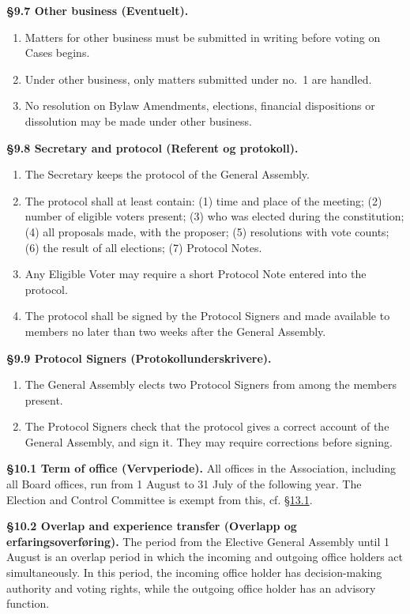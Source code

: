 \documentclass{../../../Common/Latex/Templates/rapport}
\begin{document}
\textbf{\S 9.7 Other business (Eventuelt).}\label{bylaw:9.7}
\begin{enumerate}
  \item Matters for other business must be submitted in writing before voting on Cases begins.
  \item Under other business, only matters submitted under no.\ 1 are handled.
  \item No resolution on Bylaw Amendments, elections, financial dispositions or dissolution may be made under other business.
\end{enumerate}

\textbf{\S 9.8 Secretary and protocol (Referent og protokoll).}\label{bylaw:9.8}
\begin{enumerate}
  \item The Secretary keeps the protocol of the General Assembly.
  \item The protocol shall at least contain: (1) time and place of the meeting; (2) number of eligible voters present; (3) who was elected during the constitution; (4) all proposals made, with the proposer; (5) resolutions with vote counts; (6) the result of all elections; (7) Protocol Notes.
  \item Any Eligible Voter may require a short Protocol Note entered into the protocol.
  \item The protocol shall be signed by the Protocol Signers and made available to members no later than two weeks after the General Assembly.
\end{enumerate}

\textbf{\S 9.9 Protocol Signers (Protokollunderskrivere).}\label{bylaw:9.9}
\begin{enumerate}
  \item The General Assembly elects two Protocol Signers from among the members present.
  \item The Protocol Signers check that the protocol gives a correct account of the General Assembly, and sign it. They may require corrections before signing.
\end{enumerate}

\label{bylaw:10}
\textbf{\S 10.1 Term of office (Vervperiode).}\label{bylaw:10.1} All offices in the Association, including all Board offices, run from 1 August to 31 July of the following year. The Election and Control Committee is exempt from this, cf. \hyperref[bylaw:13.1]{\S 13.1}.

\textbf{\S 10.2 Overlap and experience transfer (Overlapp og erfaringsoverføring).}\label{bylaw:10.2} The period from the Elective General Assembly until 1 August is an overlap period in which the incoming and outgoing office holders act simultaneously. In this period, the incoming office holder has decision-making authority and voting rights, while the outgoing office holder has an advisory function.
\end{document}
